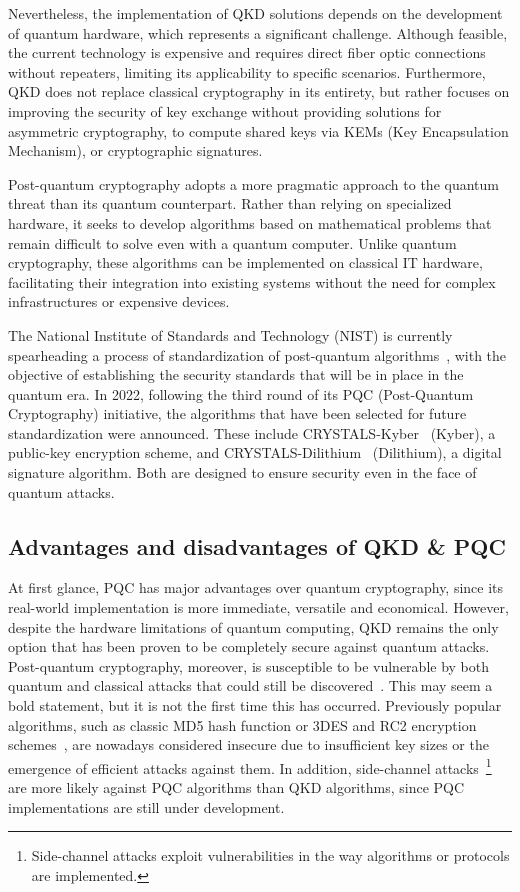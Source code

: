 \documentclass[conference]{IEEEtran}
\begin{document}
Nevertheless, the implementation of QKD solutions depends on the development of quantum hardware, which represents a significant challenge. Although feasible, the current technology is expensive and requires direct fiber optic connections without repeaters, limiting its applicability to specific scenarios. Furthermore, QKD does not replace classical cryptography in its entirety, but rather focuses on improving the security of key exchange without providing solutions for asymmetric cryptography, to compute shared keys via KEMs (Key Encapsulation Mechanism), or cryptographic signatures.

Post-quantum cryptography adopts a more pragmatic approach to the quantum threat than its quantum counterpart. Rather than relying on specialized hardware, it seeks to develop algorithms based on mathematical problems that remain difficult to solve even with a quantum computer. Unlike quantum cryptography, these algorithms can be implemented on classical IT hardware, facilitating their integration into existing systems without the need for complex infrastructures or expensive devices.

The National Institute of Standards and Technology (NIST) is currently spearheading a process of standardization of post-quantum algorithms~\cite{Alagic2022}, with the objective of establishing the security standards that will be in place in the quantum era. In 2022, following the third round of its PQC (Post-Quantum Cryptography) initiative, the algorithms that have been selected for future standardization were announced. These include CRYSTALS-Kyber~\cite{avanzi2020crystals} (Kyber), a public-key encryption scheme, and CRYSTALS-Dilithium~\cite{lyubashevsky2020crystals} (Dilithium), a digital signature algorithm. Both are designed to ensure security even in the face of quantum attacks.

\subsection{Advantages and disadvantages of QKD \& PQC \label{subsec:qkd-pqc}}

At first glance, PQC has major advantages over quantum cryptography, since its real-world implementation is more immediate, versatile and economical. However, despite the hardware limitations of quantum computing, QKD remains the only option that has been proven to be completely secure against quantum attacks. Post-quantum cryptography, moreover, is susceptible to be vulnerable by both quantum and classical attacks that could still be discovered~\cite{zeng2024practical}. This may seem a bold statement, but it is not the first time this has occurred. Previously popular algorithms, such as classic MD5 hash function or 3DES and RC2 encryption schemes~\cite{OpenStackCrypto}, are nowadays considered insecure due to insufficient key sizes or the emergence of efficient attacks against them. In addition, side-channel attacks~\footnote{Side-channel attacks exploit vulnerabilities in the way algorithms or protocols are implemented.} are more likely against PQC algorithms than QKD algorithms, since PQC implementations are still under development.
\end{document}
